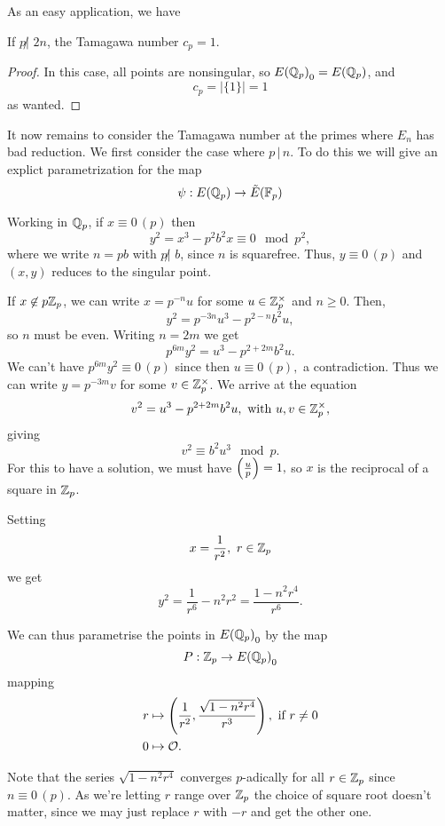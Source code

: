 \documentclass[12pt, a4paper]{report}
\begin{document}
As an easy application, we have

\begin{cor}
  If $p \not| \,\, 2n$, the Tamagawa number $c_p = 1$.
\end{cor}

\begin{proof}
  In this case, all points are nonsingular, so ${E({\mathbb Q}_p)}_0 = {E({\mathbb Q}_p)}$, and
  \[c_p = \left| \{1\} \right| = 1\]
  as wanted.
\end{proof}

It now remains to consider the Tamagawa number at the primes where $E_n$ has
bad reduction. We first consider the case where $p \, | \, n$. To do this
we will give an explict parametrization for the map
\[\psi : {E({\mathbb Q}_p)} \rightarrow {\tilde{E}(\mathbb{F}_p)}\]

Working in ${\mathbb Q}_p$, if $x \equiv 0 \, (p)$ then
\[y^2 = x^3 - p^{2}b^2 x \equiv 0 \mod{p^2}, \]
where we write $n = p b$ with $p \not| \,\, b $, since $n$ is squarefree.
Thus, $y \equiv 0 \, (p)$ and $(x,y)$ reduces to the singular point.

If $x \not\in p {\mathbb Z}_p$, we can write $x = p^{-n} u$ for some $u \in
{\mathbb Z}_p^\times$ and $n \geq 0$. Then,
\[y^2 = p^{-3n}u^3 - p^{2-n}b^2u,\]
so $n$ must be even. Writing $n = 2m$ we get
\[p^{6m}y^2 = u^3 - p^{2+2m}b^2u.\]
We can't have $p^{6m}y^2 \equiv 0 \, (p)$ since then
$u \equiv 0 \, (p),$ a contradiction. Thus we can write
$y = p^{-3m}v$ for some $v \in \mathbb{Z}_p^\times$. We arrive at the equation
\[v^2 = u^3 - p^{2+2m}b^2u, \text{ with } u, v \in \mathbb{Z}_p^\times,\]
giving
\[v^2 \equiv b^2u^3 \mod{p}.\]
For this to have a solution, we must have $\left(\frac{u}{p}\right) = 1,$
so $x$ is the reciprocal of a square in ${\mathbb Z}_p$.

Setting 
\[x = \frac{1}{r^2}, \,\, r \in {\mathbb Z}_p\]
we get
\[y^2 = \frac{1}{r^6}-{n^2}{r^2} = \frac{1-n^2r^4}{r^6}.\]

We can thus parametrise the points in ${E({\mathbb Q}_p)}_0$ by the map
\[
    P : {\mathbb Z}_p \rightarrow {E({\mathbb Q}_p)}_0  \]
mapping
\begin{equation} \label{eq:p-param}
  \begin{split}
    r &\mapsto \left(\frac{1}{r^2}, \frac{\sqrt{1-n^2r^4}}{r^3}\right), 
\text{ if } r \neq 0 \\
    0 &\mapsto {\mathcal O}.
  \end{split}
\end{equation}

Note that the series $\sqrt{1 -n^2r^4}$ converges $p$-adically for all $r \in
{\mathbb Z}_p$ since $n \equiv 0 \, (p)$. As we're letting $r$ range over ${\mathbb Z}_p$ the
choice of square root doesn't matter, since we may just replace $r$ with $-r$
and get the other one.
\end{document}
